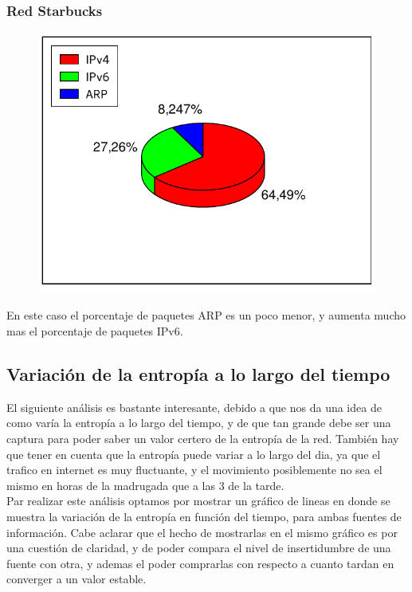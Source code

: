 \FloatBarrier
\subsubsection{Red Starbucks}

\begin{figure}[h!]
  \begin{center}
    \includegraphics{graficos/protocolos-starbucks.pdf}
	\caption{}
    \label{fig:proto-starbucks}  
  \end{center}
\end{figure}

En este caso el porcentaje de paquetes ARP es un poco menor, y aumenta mucho mas el porcentaje de paquetes IPv6.

\FloatBarrier
\subsection{Variación de la entropía a lo largo del tiempo}

El siguiente análisis es bastante interesante, debido a que nos da una idea de como varía la entropía a lo largo del tiempo, y de que tan grande debe ser una captura para poder saber un valor certero de la entropía de la red. También hay que tener en cuenta que la entropía puede variar a lo largo del dia, ya que el trafico en internet es muy fluctuante, y el movimiento posiblemente no sea el mismo en horas de la madrugada que a las 3 de la tarde.\\

Par realizar este análisis optamos por mostrar un gráfico de lineas en donde se muestra la variación de la entropía en función del tiempo, para ambas fuentes de información. Cabe aclarar que el hecho de mostrarlas en el mismo gráfico es por una cuestión de claridad, y de poder compara el nivel de insertidumbre de una fuente con otra, y ademas el poder comprarlas con respecto a cuanto tardan en converger a un valor estable. \\



